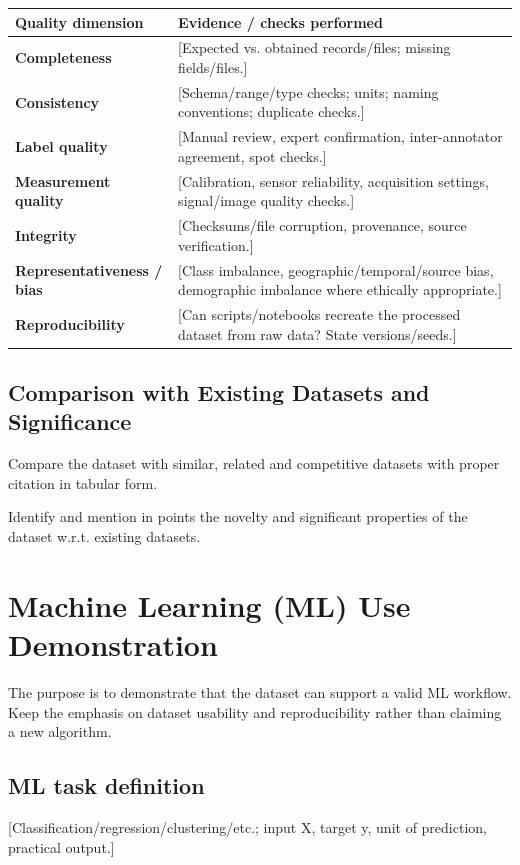 \documentclass[11pt,a4paper]{article}
\begin{document}
\noindent
\begin{tabularx}{\textwidth}{|p{4.5cm}|X|}
\hline
\textbf{Quality dimension} & \textbf{Evidence / checks performed} \\
\hline
\textbf{Completeness} & [Expected vs. obtained records/files; missing fields/files.] \\
\hline
\textbf{Consistency} & [Schema/range/type checks; units; naming conventions; duplicate checks.] \\
\hline
\textbf{Label quality} & [Manual review, expert confirmation, inter-annotator agreement, spot checks.] \\
\hline
\textbf{Measurement quality} & [Calibration, sensor reliability, acquisition settings, signal/image quality checks.] \\
\hline
\textbf{Integrity} & [Checksums/file corruption, provenance, source verification.] \\
\hline
\textbf{Representativeness / bias} & [Class imbalance, geographic/temporal/source bias, demographic imbalance where ethically appropriate.] \\
\hline
\textbf{Reproducibility} & [Can scripts/notebooks recreate the processed dataset from raw data? State versions/seeds.] \\
\hline
\end{tabularx}

\subsection{Comparison with Existing Datasets and Significance}
Compare the dataset with similar, related and competitive datasets with proper citation in tabular form. 

Identify and mention in points the novelty and significant properties of the dataset w.r.t. existing datasets.

\vspace{1.5em}

\section{Machine Learning (ML) Use Demonstration}
The purpose is to demonstrate that the dataset can support a valid ML workflow. Keep the emphasis on dataset usability and reproducibility rather than claiming a new algorithm.

\subsection{ML task definition}
[Classification/regression/clustering/etc.; input X, target y, unit of prediction, practical output.]
\end{document}
